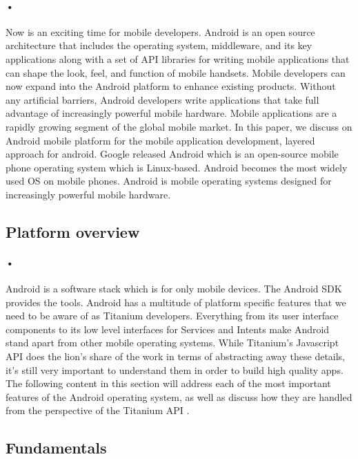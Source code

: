 \documentclass[12pt]{article}
\begin{document}
\paragraph{•}Now is an exciting time for mobile developers. Android \cite{kanjilal} is an open source architecture that includes the operating system, middleware, and its key applications along with a set of API libraries for writing mobile applications that can shape the look, feel, and function of mobile handsets. Mobile developers can now expand into the Android platform to enhance existing products. Without any artificial barriers, Android developers write applications that take full advantage of increasingly powerful mobile hardware. Mobile applications are a rapidly growing segment of the global mobile market. In this paper, we discuss on Android mobile platform for the mobile application development, layered approach for android. Google released Android which is an open-source mobile phone operating system which is Linux-based. Android becomes the most widely used OS on mobile phones.  Android\cite{Android} is mobile operating systems designed for increasingly powerful mobile hardware.   

\subsection{Platform overview}

\paragraph{•}Android is a software stack which is for only mobile devices. The Android SDK provides the tools. Android has a multitude of platform specific features that we need to be aware of as Titanium developers. Everything from its user interface components to its low level interfaces for Services and Intents make Android stand apart from other mobile operating systems. While Titanium's Javascript API does the lion's share of the work in terms of abstracting away these details, it's still very important to understand them in order to build high quality apps. The following content in this section will address each of the most important features of the Android operating system, as well as discuss how they are handled from the perspective of the Titanium API \cite{Kevin}. 
\subsection{Fundamentals}
\end{document}
